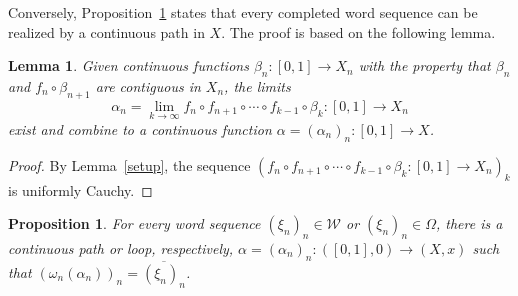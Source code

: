 \documentclass{amsart}
\newtheorem{lemma}[theorem]{Lemma}
\newtheorem{proposition}[theorem]{Proposition}
\theoremstyle{definition}
\theoremstyle{remark}
\numberwithin{equation}{section}
\begin{document}
Conversely, Proposition~\ref{realization} states that every completed word sequence can be realized by a continuous path in $X$. The proof is based on the following lemma.

\begin{lemma}\label{Cauchy}
Given continuous functions $\beta_n:[0,1]\rightarrow X_n$ with the property that $\beta_n$ and $f_n\circ \beta_{n+1}$ are contiguous in $X_n$, the  limits \[ \alpha_n=\lim_{k\rightarrow \infty} f_n\circ f_{n+1}\circ\cdots \circ f_{k-1}\circ \beta_k:[0,1]\rightarrow X_n\] exist and combine to a continuous
    function $\alpha=(\alpha_n)_n:[0,1]\rightarrow X$.
\end{lemma}

\begin{proof}
By Lemma~\ref{setup}, the sequence $(f_n\circ f_{n+1}\circ\cdots \circ f_{k-1}\circ \beta_k:[0,1]\rightarrow X_n)_k$ is uniformly Cauchy.
\end{proof}

\begin{proposition}\label{realization} For every word sequence $(\xi_n)_n\in {\mathcal W}$ or $(\xi_n)_n\in \Omega$, there is a continuous path or loop, respectively, $\alpha=(\alpha_n)_n:([0,1],0)\rightarrow (X,x)$ such that  $(\omega_n(\alpha_n))_n=\overline{(\xi_n)_n}$.
\end{proposition}
\end{document}
